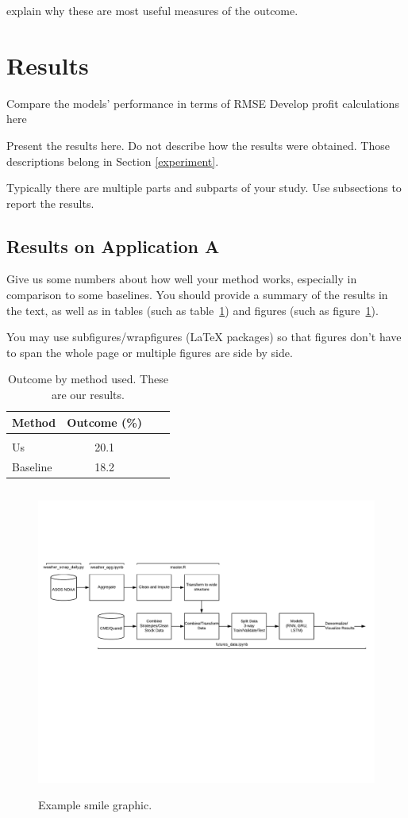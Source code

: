 \documentclass[twoside,11pt]{article}
\begin{document}
explain why these are most useful measures of the outcome.

\section{Results} \label{results}

Compare the models' performance in terms of RMSE
Develop profit calculations here

Present the results here.
Do not describe how the results were obtained.
Those descriptions belong in Section \ref{experiment}.

Typically there are multiple parts and subparts of your study.
Use subsections to report the results.

\subsection{Results on Application A}

Give us some numbers about how well your method works, especially in comparison to some baselines.
You should provide a summary of the results in the text, as well as in tables (such as table~\ref{tab:example}) and figures (such as figure~\ref{fig:example}).

You may use subfigures/wrapfigures (LaTeX packages) so that figures don't have to span the whole page or multiple figures are side by side.

\begin{table}[htbp]
  \centering
  \begin{tabular}{lclc}
    Method & Outcome (\%) \\
    \hline \\[-11pt]
    Us & 20.1 \\
    Baseline & 18.2 \\ \hline
  \end{tabular}
  \label{tab:example}
    \caption{Outcome by method used. These are our results.}
\end{table}

\begin{figure}[htbp]
  \centering
  \includegraphics[height=4in]{DataPipeline.png}
  \caption{Example smile graphic.}
  \label{fig:example}
\end{figure}
\end{document}
